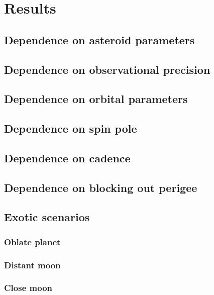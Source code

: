 \documentclass[linenumbers]{aastex631}
\begin{document}
\section{Results}
\subsection{Dependence on asteroid parameters}

\subsection{Dependence on observational precision}

\subsection{Dependence on orbital parameters}

\subsection{Dependence on spin pole}

\subsection{Dependence on cadence}

\subsection{Dependence on blocking out perigee}

\subsection{Exotic scenarios}

\subsubsection{Oblate planet}

\subsubsection{Distant moon}

\subsubsection{Close moon}
\end{document}
